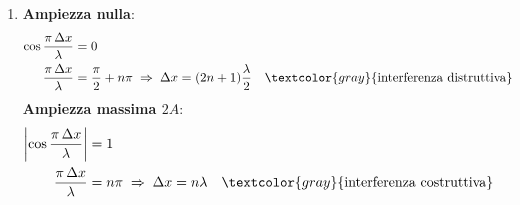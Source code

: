 \begin{question}[ID=fac.1, subtitle={Interferenza di onde: sovrapposizione e ampiezza}, tags={goniometria, fisica, interferenza}, difficulty=difficile]
\begin{explanation}
\begin{enumerate}[label=\alph*)]
\[\begin{aligned}
    y &= 2A\cos\dfrac{\pi\,\Delta x}{\lambda}\cdot\sin\left[2\pi\left(\dfrac{x_1+x_2}{2\lambda}-\dfrac tT\right)\right]
    \end{aligned}\]
    Il secondo fattore è un'onda sinusoidale con lo stesso periodo $T$; il primo non contiene $t$, quindi fa da ampiezza costante nel tempo.
    \item \textbf{Ampiezza nulla}:
    \[\begin{aligned}
    \cos\dfrac{\pi\,\Delta x}{\lambda} &= 0\\
    \dfrac{\pi\,\Delta x}{\lambda} &= \dfrac\pi2+n\pi \;\Rightarrow\; \Delta x=(2n+1)\dfrac\lambda2 && \textcolor{gray}{\text{interferenza distruttiva}}
    \end{aligned}\]
    \textbf{Ampiezza massima $2A$}:
    \[\begin{aligned}
    \left|\cos\dfrac{\pi\,\Delta x}{\lambda}\right| &= 1\\
    \dfrac{\pi\,\Delta x}{\lambda} &= n\pi \;\Rightarrow\; \Delta x=n\lambda && \textcolor{gray}{\text{interferenza costruttiva}}
    \end{aligned}\]
\end{enumerate}
\end{explanation}
\end{question}
